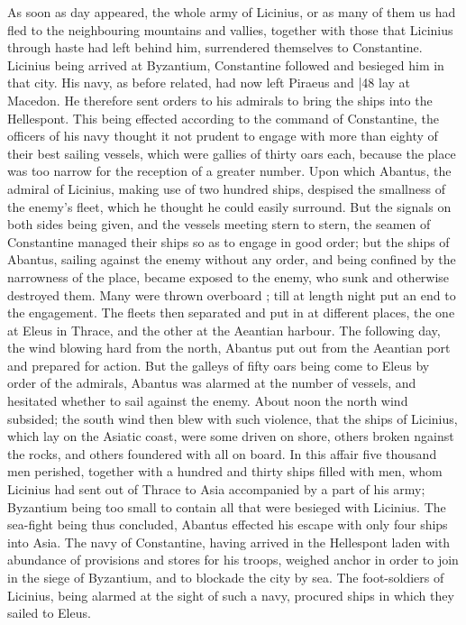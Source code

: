 As soon as day appeared, the whole army of Licinius, or as many of them us had fled to the
neighbouring mountains and vallies, together with those that Licinius through haste had left behind him, surrendered themselves to Constantine. Licinius being arrived at Byzantium, Constantine followed and besieged him in that city. His navy, as before related, had now left Piraeus and
|48 lay at Macedon. He therefore sent orders to his admirals to bring the ships into the Hellespont. This being effected according to the command of Constantine, the officers of his navy thought it not prudent to engage with more than eighty of their best sailing vessels, which were gallies of thirty oars each, because the place was too narrow for the reception of a greater number. Upon which Abantus, the admiral of Licinius, making use of two hundred ships, despised the smallness of the enemy's fleet, which he thought he could easily surround. But the signals on both sides being given, and the vessels meeting stern to stern, the seamen of Constantine managed their ships so as to engage in good order; but the ships of Abantus, sailing against the enemy without any order, and being confined by the narrowness of the place, became exposed to the enemy, who sunk and otherwise destroyed them. Many were thrown overboard ; till at length night put an end to the engagement. The fleets then separated and put in at different places, the one at Eleus in Thrace, and the other at the Aeantian harbour. The following day, the wind blowing hard from the north, Abantus put out from the Aeantian port and prepared for action. But the galleys of fifty oars being come to Eleus by order of the admirals, Abantus was alarmed at the number of vessels, and hesitated whether to sail against the enemy. About noon the north wind subsided; the south wind then blew with such violence, that the ships of Licinius, which lay on the Asiatic coast, were some driven on shore, others broken ngainst the rocks, and others foundered with all on board. In this affair five thousand men perished, together with a hundred and thirty ships filled with men, whom Licinius had sent out of Thrace to Asia accompanied by a part of his army; Byzantium being too small to contain all that were besieged with Licinius. The sea-fight being thus concluded, Abantus effected his escape with only four ships into Asia. The navy of Constantine, having arrived in the Hellespont laden with abundance of provisions and stores for his troops, weighed anchor in order to join in the siege of Byzantium, and to blockade the city by sea. The foot-soldiers of Licinius, being alarmed at the sight of such a navy, procured ships in which they sailed to Eleus.

